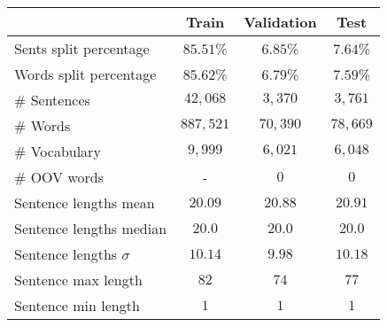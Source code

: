 \begin{tabular}{lccc}
    \toprule
    & Train & Validation & Test \\
    \midrule
    Sents split percentage & 
    \(85.51\)\% & \(6.85\)\% & \(7.64\)\%  \\
    Words split percentage & 
    \(85.62\)\% & \(6.79\)\% & \(7.59\)\%  \\
    \# Sentences & 
    \(42,068\) & \(3,370\) & \(3,761\) \\
    \# Words & 
    \(887,521\) & \(70,390\) & \(78,669\) \\ 
    \# Vocabulary & 
    \(9,999\) & \(6,021\) & \(6,048\) \\
    \# OOV words & 
    - & \(0\) & \(0\) \\
    \midrule
    Sentence lengths mean & 
    \(20.09\) & \(20.88\) & \(20.91\) \\
    Sentence lengths median & 
    \(20.0\) & \(20.0\) & \(20.0\) \\
    Sentence lengths \(\sigma\) &
    \(10.14\) & \(9.98\) & \(10.18\) \\
    Sentence max length & 
    \(82\) & \(74\) & \(77\) \\
    Sentence min length & 
    \(1\) & \(1\) & \(1\) \\

    \bottomrule
\end{tabular}